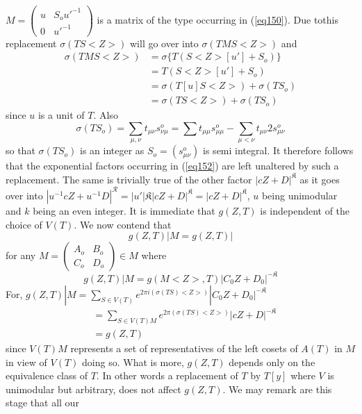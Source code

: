 $M = \begin{pmatrix} u & S_o u'^{-1} \\ 0 & u'^{-1}\end{pmatrix}$
is a matrix of the type occurring in (\ref{eq150}). Due
to\pageoriginale  this replacement 
$\sigma (TS < Z >)$ will go over into $\sigma (TMS < Z >)$ and  
\begin{align*}
\sigma (TMS < Z >) &= \sigma \{ T (S < Z > [ u' ] + S_o ) \} \\
&= T(S < Z > [ u' ] + S_o ) \\
&=\sigma (T [ u ] S < Z >) + \sigma (TS_o) \\
&=\sigma  (TS < Z >) + \sigma (TS_o)
\end{align*}
since $u$ is a unit of $T$. Also
$$
\sigma (TS_o) = \sum_{\mu, \nu} t_{\mu \nu} s^o_{\nu \mu} = \sum 
t_{\mu \mu} s^o_{\mu \mu}  - \sum_{\mu < \nu} t_{\mu \nu} 2 s^o_{\mu
  \nu} 
$$
so that $\sigma (TS_o)$ is an integer as $S_o = (s^o_{\mu \nu})$ is
semi integral. It therefore follows that the exponential factors
occurring in (\ref{eq152}) are left unaltered by such a replacement. The
same is trivially true of the other factor $ | c Z + D |^\mathfrak{K} $
as it goes over into $| u^{-1} cZ + u^{-1} D |^{\mathscr{R}} = | u'
|\mathfrak{K} | cZ + D |^\mathfrak{K} = | cZ  + D |^\mathfrak{K}$, $u$
being unimodular and $k$ being an even integer. It is immediate that
$g (Z, T)$ is independent of the choice of $V (T)$. We now contend
that 
\begin{equation*}
g (Z, T) | M = g (Z, T) | \tag{153}\label{eq153}
\end{equation*}
for any $M = \begin{pmatrix} A_o  & B_o \\ C_o & D_o \end{pmatrix} \in
M$ where 
$$
g (Z, T) | M = g (M < Z >, T)  |C_0 Z + D_0|^{-\mathfrak{K}}
$$
For,
$g (Z, T) | M = \sum_{S \in V (T)} e^{2 \pi i (\sigma (TS) <Z>) } |C_0 Z +
D_0|^{-\mathfrak{K}}$  
\begin{align*}
&= \sum_{S \in V (T) M} e^{2 \pi (\sigma (TS) < Z > )} | cZ + D
  |^{-\mathfrak{K}} \\ 
&= g(Z, T)
\end{align*}\pageoriginale 
since $V (T) M$ represents a set of representatives of the left cosets
of $A (T)$ in $M$ in view of $V (T)$ doing so. What is more, $g (Z,
T)$ depends only on the equivalence class of $T$. In other words a
replacement of $T$ by $T [y]$ where $V$ is unimodular but arbitrary,
does not affect $g(Z, T)$. We may remark are this stage that all our
